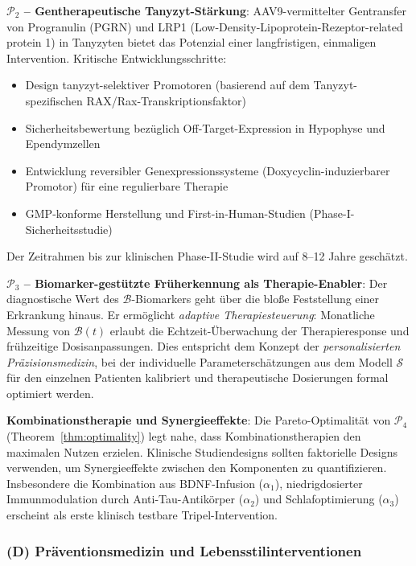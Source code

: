 ﻿\documentclass[12pt,a4paper]{article}
\theoremstyle{definition}
\begin{document}
	\textbf{$\mathcal{P}_2$ -- Gentherapeutische Tanyzyt-Stärkung}: AAV9-vermittelter Gentransfer von Progranulin (PGRN) und LRP1 (Low-Density-Lipoprotein-Rezeptor-related protein 1) in Tanyzyten bietet das Potenzial einer langfristigen, einmaligen Intervention. Kritische Entwicklungsschritte:
	\begin{itemize}
		\item Design tanyzyt-selektiver Promotoren (basierend auf dem Tanyzyt-spezifischen RAX/Rax-Transkriptionsfaktor)
		\item Sicherheitsbewertung bezüglich Off-Target-Expression in Hypophyse und Ependymzellen
		\item Entwicklung reversibler Genexpressionssysteme (Doxycyclin-induzierbarer Promotor) für eine regulierbare Therapie
		\item GMP-konforme Herstellung und First-in-Human-Studien (Phase-I-Sicherheitsstudie)
	\end{itemize}
	Der Zeitrahmen bis zur klinischen Phase-II-Studie wird auf 8--12 Jahre geschätzt.

	\textbf{$\mathcal{P}_3$ -- Biomarker-gestützte Früherkennung als Therapie-Enabler}: Der diagnostische Wert des $\mathcal{B}$-Biomarkers geht über die bloße Feststellung einer Erkrankung hinaus. Er ermöglicht \emph{adaptive Therapiesteuerung}: Monatliche Messung von $\mathcal{B}(t)$ erlaubt die Echtzeit-Überwachung der Therapieresponse und frühzeitige Dosisanpassungen. Dies entspricht dem Konzept der \emph{personalisierten Präzisionsmedizin}, bei der individuelle Parameterschätzungen aus dem Modell $\mathcal{S}$ für den einzelnen Patienten kalibriert und therapeutische Dosierungen formal optimiert werden.

	\textbf{Kombinationstherapie und Synergieeffekte}: Die Pareto-Optimalität von $\mathcal{P}_4$ (Theorem~\ref{thm:optimality}) legt nahe, dass Kombinationstherapien den maximalen Nutzen erzielen. Klinische Studiendesigns sollten faktorielle Designs verwenden, um Synergieeffekte zwischen den Komponenten zu quantifizieren. Insbesondere die Kombination aus BDNF-Infusion ($\alpha_1$), niedrigdosierter Immunmodulation durch Anti-Tau-Antikörper ($\alpha_2$) und Schlafoptimierung ($\alpha_3$) erscheint als erste klinisch testbare Tripel-Intervention.

	\subsubsection*{(D) Präventionsmedizin und Lebensstilinterventionen}
\end{document}
